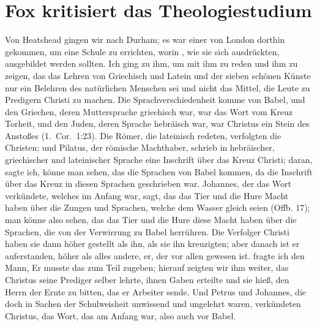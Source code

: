 \section{Fox kritisiert das Theologiestudium}

Von Heatshead gingen wir nach Durham; es war einer von London
dorthin gekommen, um eine Schule zu errichten, worin , wie sie sich ausdrückten, ausgebildet werden sollten. 
 Ich
ging zu ihm, um mit ihm zu reden und ihm zu zeigen, das das
Lehren von Griechisch und Latein und der sieben schönen Künste
nur ein Belehren des natürlichen Menschen sei und nicht das
Mittel, die Leute zu Predigern Christi zu machen. 
  
Die Sprachverschiedenheit 
komme von Babel, und den Griechen, deren Muttersprache 
griechisch war, war das Wort vom Kreuz Torheit, und
den Juden, deren Sprache hebräisch war, war Christus ein
Stein des Anstoßes 
(1.~Cor.~1:23).
Die Römer, die lateinisch
redeten, verfolgten die Christen; und Pilatus, der römische
Machthaber, schrieb in hebräischer, griechischer und lateinischer
Sprache eine Inschrift über das Kreuz Christi; daran, sagte ich,
könne man sehen, das die Sprachen von Babel kommen, da die
Inschrift über das Kreuz in diesen Sprachen geschrieben war.
Johannes, der das Wort verkündete, welches im Anfang war,
sagt, das das Tier und die Hure Macht haben über die
Zungen und Sprachen, welche dem Wasser gleich seien 
(Offb. 17);
man könne also sehen, das das Tier und die Hure diese Macht
haben über die Sprachen, die von der Verwirrung zu Babel 
herrühren. Die Verfolger Christi haben sie dann höher gestellt als
ihn, als sie ihn kreuzigten; aber danach ist er auferstanden, höher
als alles andere, er, der vor allen gewesen ist.  fragte ich den Mann,  Er musste das zum Teil zugeben; hierauf zeigten
wir ihm weiter, das Christus seine Prediger selber lehrte, ihnen
Gaben erteilte und sie hieß, den Herrn der Ernte zu bitten, das
er Arbeiter sende. Und Petrus und Johannes, die doch in Sachen
der Schulweisheit unwissend und 
ungelehrt waren, verkündeten
Christus, das Wort, das am Anfang war, also auch vor Babel.

